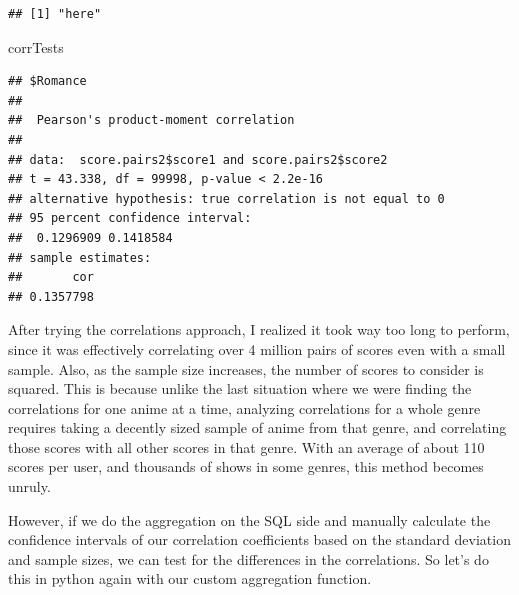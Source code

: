 \documentclass[
]{article}
\newenvironment{Shaded}{\begin{snugshade}}{\end{snugshade}}
\newcommand{\AttributeTok}[1]{\textcolor[rgb]{0.77,0.63,0.00}{#1}}
\newcommand{\DecValTok}[1]{\textcolor[rgb]{0.00,0.00,0.81}{#1}}
\newcommand{\FunctionTok}[1]{\textcolor[rgb]{0.00,0.00,0.00}{#1}}
\newcommand{\NormalTok}[1]{#1}
\newcommand{\OtherTok}[1]{\textcolor[rgb]{0.56,0.35,0.01}{#1}}
\newcommand{\SpecialCharTok}[1]{\textcolor[rgb]{0.00,0.00,0.00}{#1}}
\newcommand{\StringTok}[1]{\textcolor[rgb]{0.31,0.60,0.02}{#1}}
\begin{document}
\begin{Shaded}
\end{Shaded}

\begin{verbatim}
## [1] "here"
\end{verbatim}

\begin{Shaded}
\begin{Highlighting}[]
\NormalTok{corrTests}
\end{Highlighting}
\end{Shaded}

\begin{verbatim}
## $Romance
## 
##  Pearson's product-moment correlation
## 
## data:  score.pairs2$score1 and score.pairs2$score2
## t = 43.338, df = 99998, p-value < 2.2e-16
## alternative hypothesis: true correlation is not equal to 0
## 95 percent confidence interval:
##  0.1296909 0.1418584
## sample estimates:
##       cor 
## 0.1357798
\end{verbatim}

After trying the correlations approach, I realized it took way too long
to perform, since it was effectively correlating over 4 million pairs of
scores even with a small sample. Also, as the sample size increases, the
number of scores to consider is squared. This is because unlike the last
situation where we were finding the correlations for one anime at a
time, analyzing correlations for a whole genre requires taking a
decently sized sample of anime from that genre, and correlating those
scores with all other scores in that genre. With an average of about 110
scores per user, and thousands of shows in some genres, this method
becomes unruly.

However, if we do the aggregation on the SQL side and manually calculate
the confidence intervals of our correlation coefficients based on the
standard deviation and sample sizes, we can test for the differences in
the correlations. So let's do this in python again with our custom
aggregation function.
\end{document}
